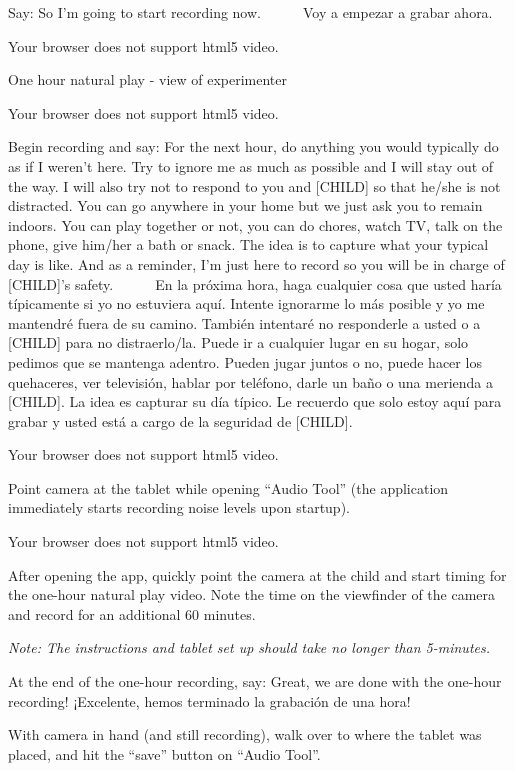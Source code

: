 \documentclass[
  12pt,
]{book}
\begin{document}
Say: So I'm going to start recording now.
    Voy a empezar a grabar ahora.

Your browser does not support html5 video.

One hour natural play - view of experimenter

Your browser does not support html5 video.

Begin recording and say: For the next hour, do anything you would typically do as if I weren't here. Try to ignore me as much as possible and I will stay out of the way. I will also try not to respond to you and {[}CHILD{]} so that he/she is not distracted. You can go anywhere in your home but we just ask you to remain indoors. You can play together or not, you can do chores, watch TV, talk on the phone, give him/her a bath or snack. The idea is to capture what your typical day is like. And as a reminder, I'm just here to record so you will be in charge of {[}CHILD{]}'s safety.
    En la próxima hora, haga cualquier cosa que usted haría típicamente si yo no estuviera aquí. Intente ignorarme lo más posible y yo me mantendré fuera de su camino. También intentaré no responderle a usted o a {[}CHILD{]} para no distraerlo/la. Puede ir a cualquier lugar en su hogar, solo pedimos que se mantenga adentro. Pueden jugar juntos o no, puede hacer los quehaceres, ver televisión, hablar por teléfono, darle un baño o una merienda a {[}CHILD{]}. La idea es capturar su día típico. Le recuerdo que solo estoy aquí para grabar y usted está a cargo de la seguridad de {[}CHILD{]}.

Your browser does not support html5 video.

Point camera at the tablet while opening ``Audio Tool'' (the application immediately starts recording noise levels upon startup).

Your browser does not support html5 video.

After opening the app, quickly point the camera at the child and start timing for the one-hour natural play video. Note the time on the viewfinder of the camera and record for an additional 60 minutes.

\emph{Note: The instructions and tablet set up should take no longer than 5-minutes.}

At the end of the one-hour recording, say: Great, we are done with the one-hour recording! ¡Excelente, hemos terminado la grabación de una hora!

With camera in hand (and still recording), walk over to where the tablet was placed, and hit the ``save'' button on ``Audio Tool''.
\end{document}
